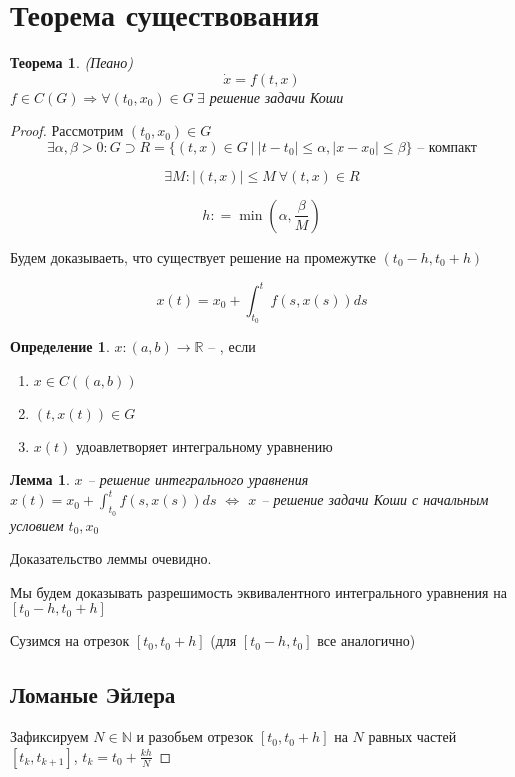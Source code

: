 \documentclass[a4paper]{article}
\theoremstyle{indented}
\newtheorem*{theorem}{Теорема}
\newtheorem*{lemma}{Лемма}
\theoremstyle{definition}
\newtheorem*{defn}{Определение}
\theoremstyle{remark}
\begin{document}
\section{Теорема существования}
\begin{theorem}
   (Пеано)
  \[\dot x = f(t,x)\]
  $f \in C(G) \Rightarrow \forall (t_0,x_0) \in G \ \exists $ решение задачи Коши
\end{theorem}
\begin{proof}
  Рассмотрим $(t_0,x_0) \in G$
  \[\exists \alpha, \beta > 0 : G \supset R = \{ (t,x) \in G \ | \ |t - t_0| \leqslant \alpha, |x-x_0| \leqslant \beta\} \text{ -- компакт}\] 

  \[\exists M : |(t,x)| \leqslant M \ \forall  (t,x) \in R\] 

  \[h: = \min(\alpha, \frac{\beta}{M})\]

  Будем доказываеть, что существует решение на промежутке $(t_0 - h, t_0 + h)$


  \[x(t) = x_0 +  \int_{t_0}^{t}f(s,x(s)) ds\]
  \begin{defn}
	 $x : (a,b) \to \mathbb{R} $ --
     , если
     \begin{enumerate}
     \item $x \in C((a,b))$
     \item $(t,x(t)) \in G$
     \item $x(t)$ удоавлетворяет интегральному уравнению
     \end{enumerate}
  \end{defn}

  \begin{lemma}
    $x$ -- решение интегрального уравнения $x(t) = x_0 +  \int_{t_0}^{t}f(s,x(s)) ds$
    $\Leftrightarrow$
    $x$ -- решение задачи Коши с начальным условием $t_0,x_0$
  \end{lemma}
  Доказательство леммы очевидно.

  Мы будем доказывать разрешимость эквивалентного интегрального уравнения на $[t_0-h, t_0 + h]$

  Сузимся на отрезок $[t_0,t_0+h]$ (для $[t_0-h, t_0]$ все аналогично)  

  \subsection{Ломаные Эйлера}
  Зафиксируем $N \in \mathbb{N}$ и разобьем отрезок $[t_0,t_0+h]$ на $N$ равных частей $[t_k,t_{k+1}]$, $t_k = t_0 + \frac{kh}{N}$


\end{proof}
\end{document}
